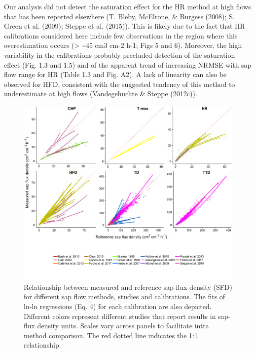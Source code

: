 \documentclass[11pt,twoside]{reedthesis}
\begin{document}
Our analysis did not detect the saturation effect for the HR method at
high flows that has been reported elsewhere (T. Bleby, McElrone, \&
Burgess (2008); S. Green et al. (2009); Steppe et al. (2015)). This is
likely due to the fact that HR calibrations considered here include few
observations in the region where this overestimation occurs
(\textgreater{} \textasciitilde{}45 cm3 cm-2 h-1; Figs 5 and 6).
Moreover, the high variability in the calibrations probably precluded
detection of the saturation effect (Fig. 1.3 and 1.5) and of the
apparent trend of increasing NRMSE with sap flow range for HR (Table 1.3
and Fig. A2). A lack of linearity can also be observed for HFD,
consistent with the suggested tendency of this method to underestimate
at high flows (Vandegehuchte \& Steppe (2012c)).\par
\begin{figure}[p]

{\centering \includegraphics[width=1\linewidth]{figure/CH2/figure-density} 

}

\caption[Relationship between measured and reference sap-flux density (SFD) for different sap flow methods, studies and calibrations.]{Relationship between measured and reference sap-flux density (SFD) for different sap flow methods, studies and calibrations. The fits of ln-ln regressions (Eq. 4) for each calibration are also depicted. Different colors represent different studies that report results in sap-flux density units. Scales vary across panels to facilitate intra method comparison. The red dotted line indicates the 1:1 relationship.}\label{fig:ch2fig5}
\end{figure}
\end{document}
